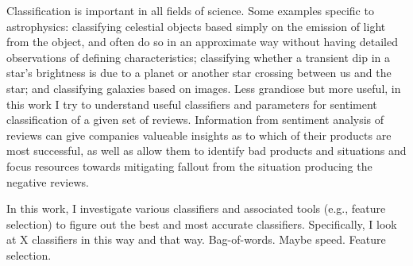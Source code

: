 Classification is important in all fields of science.  Some examples specific to astrophysics: classifying celestial objects based simply on the emission of light from the object, and often do so in an approximate way without having detailed observations of defining characteristics; classifying whether a transient dip in a star's brightness is due to a planet or another star crossing between us and the star; and classifying galaxies based on images.  Less grandiose but more useful, in this work I try to understand useful classifiers and parameters for sentiment classification of a given set of reviews.  Information from sentiment analysis of reviews can give companies valueable insights as to which of their products are most successful, as well as allow them to identify bad products and situations and focus resources towards mitigating fallout from the situation producing the negative reviews.

In this work, I investigate various classifiers and associated tools (e.g., feature selection) to figure out the best and most accurate classifiers.  Specifically, I look at X classifiers in this way and that way.  Bag-of-words.  Maybe speed.  Feature selection.